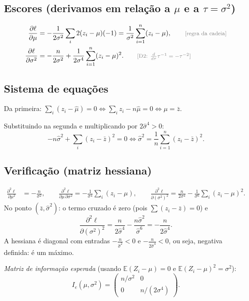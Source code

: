 \documentclass[11pt,a4paper]{article}
\newcommand{\E}{\mathbb{E}}
\newcommand{\just}[1]{\tag*{\footnotesize\textcolor{gray}{[#1]}}}
\theoremstyle{definition}
\theoremstyle{plain}
\begin{document}
\subsection*{Escores (derivamos em relação a $\mu$ e a $\tau=\sigma^2$)}
\begin{align*}
\frac{\partial\ell}{\partial\mu}&=-\frac{1}{2\sigma^2}\sum_i2(z_i-\mu)(-1)=\frac{1}{\sigma^2}\sum_{i=1}^n(z_i-\mu), \just{regra da cadeia}\\
\frac{\partial\ell}{\partial\sigma^2}&=-\frac{n}{2\sigma^2}+\frac{1}{2\sigma^4}\sum_{i=1}^n(z_i-\mu)^2 . \just{D2: $\frac{d}{d\tau}\tau^{-1}=-\tau^{-2}$}
\end{align*}

\subsection*{Sistema de equações}
Da primeira: $\sum_i(z_i-\hat\mu)=0\iff\sum_iz_i-n\hat\mu=0\iff\hat\mu=\bar z$.

Substituindo na segunda e multiplicando por $2\hat\sigma^4>0$:
\[
-n\hat\sigma^2+\sum_i(z_i-\bar z)^2=0\iff\hat\sigma^2=\frac1n\sum_{i=1}^n(z_i-\bar z)^2 .
\]

\subsection*{Verificação (matriz hessiana)}
\begin{align*}
\frac{\partial^2\ell}{\partial\mu^2}&=-\frac{n}{\sigma^2},\qquad
\frac{\partial^2\ell}{\partial\mu\,\partial\sigma^2}=-\frac{1}{\sigma^4}\sum_i(z_i-\mu),\qquad
\frac{\partial^2\ell}{\partial(\sigma^2)^2}=\frac{n}{2\sigma^4}-\frac{1}{\sigma^6}\sum_i(z_i-\mu)^2 .
\end{align*}
No ponto $(\bar z,\hat\sigma^2)$: o termo cruzado é zero (pois $\sum(z_i-\bar z)=0$) e
\[
\frac{\partial^2\ell}{\partial(\sigma^2)^2}=\frac{n}{2\hat\sigma^4}-\frac{n\hat\sigma^2}{\hat\sigma^6}=-\frac{n}{2\hat\sigma^4}.
\]
A hessiana é diagonal com entradas $-\frac{n}{\hat\sigma^2}<0$ e $-\frac{n}{2\hat\sigma^4}<0$, ou seja, negativa definida: é um máximo.

\textit{Matriz de informação esperada} (usando $\E(Z_i-\mu)=0$ e $\E(Z_i-\mu)^2=\sigma^2$):
\[
I_e(\mu,\sigma^2)=
\begin{pmatrix}
n/\sigma^2 & 0\\
0 & n/(2\sigma^4)
\end{pmatrix}.
\]
\end{document}
